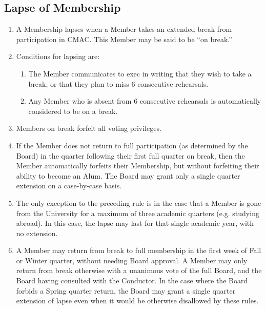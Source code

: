 \documentclass{article}
\begin{document}
\subsection{Lapse of Membership}
\begin{enumerate}
\item A Membership lapses when a Member takes an extended break from
  participation in CMAC. This Member may be said to be ``on break.''
\item Conditions for lapsing are:
  \begin{enumerate}
  \item The Member communicates to exec in writing that they wish to take a
    break, or that they plan to miss 6 consecutive rehearsals.
  \item Any Member who is absent from 6 consecutive rehearsals is automatically
    considered to be on a break.
  \end{enumerate}
\item Members on break forfeit all voting privileges.
\item If the Member does not return to full participation (as determined by the
  Board) in the quarter following their first full quarter on break, then the
  Member automatically forfeits their Membership, but without forfeiting their
  ability to become an Alum. The Board may grant only a single quarter extension
  on a case-by-case basis.
\item The only exception to the preceding rule is in the case that a Member is
  gone from the University for a maximum of three academic quarters
  (e.g. studying abroad). In this case, the lapse may last for that single
  academic year, with no extension.
\item A Member may return from break to full membership in the first week of
  Fall or Winter quarter, without needing Board approval. A Member may only
  return from break otherwise with a unanimous vote of the full Board, and the
  Board having consulted with the Conductor. In the case where the Board forbids
  a Spring quarter return, the Board may grant a single quarter extension of
  lapse even when it would be otherwise disallowed by these rules.
\end{enumerate}

\end{document}
